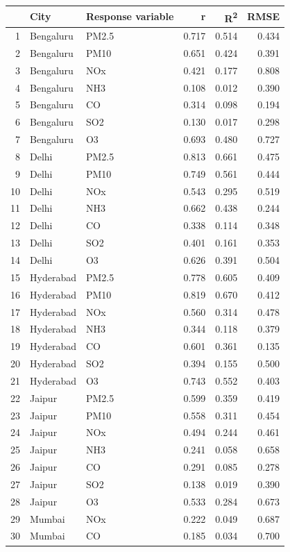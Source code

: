 \documentclass[twoside,11pt]{article}
\begin{document}
\begin{table}[ht]
\centering
\begin{tabular}{rllrrr}
  \hline
  & City & Response variable & r & R\textsuperscript{2} & RMSE \\
  \hline
1 & Bengaluru & PM2.5 & 0.717 & 0.514 & 0.434 \\ 
  2 & Bengaluru & PM10 & 0.651 & 0.424 & 0.391 \\ 
  3 & Bengaluru & NOx & 0.421 & 0.177 & 0.808 \\ 
  4 & Bengaluru & NH3 & 0.108 & 0.012 & 0.390 \\ 
  5 & Bengaluru & CO & 0.314 & 0.098 & 0.194 \\ 
  6 & Bengaluru & SO2 & 0.130 & 0.017 & 0.298 \\ 
  7 & Bengaluru & O3 & 0.693 & 0.480 & 0.727 \\ 
  8 & Delhi & PM2.5 & 0.813 & 0.661 & 0.475 \\ 
  9 & Delhi & PM10 & 0.749 & 0.561 & 0.444 \\ 
  10 & Delhi & NOx & 0.543 & 0.295 & 0.519 \\ 
  11 & Delhi & NH3 & 0.662 & 0.438 & 0.244 \\ 
  12 & Delhi & CO & 0.338 & 0.114 & 0.348 \\ 
  13 & Delhi & SO2 & 0.401 & 0.161 & 0.353 \\ 
  14 & Delhi & O3 & 0.626 & 0.391 & 0.504 \\ 
  15 & Hyderabad & PM2.5 & 0.778 & 0.605 & 0.409 \\ 
  16 & Hyderabad & PM10 & 0.819 & 0.670 & 0.412 \\ 
  17 & Hyderabad & NOx & 0.560 & 0.314 & 0.478 \\ 
  18 & Hyderabad & NH3 & 0.344 & 0.118 & 0.379 \\ 
  19 & Hyderabad & CO & 0.601 & 0.361 & 0.135 \\ 
  20 & Hyderabad & SO2 & 0.394 & 0.155 & 0.500 \\ 
  21 & Hyderabad & O3 & 0.743 & 0.552 & 0.403 \\ 
  22 & Jaipur & PM2.5 & 0.599 & 0.359 & 0.419 \\ 
  23 & Jaipur & PM10 & 0.558 & 0.311 & 0.454 \\ 
  24 & Jaipur & NOx & 0.494 & 0.244 & 0.461 \\ 
  25 & Jaipur & NH3 & 0.241 & 0.058 & 0.658 \\ 
  26 & Jaipur & CO & 0.291 & 0.085 & 0.278 \\ 
  27 & Jaipur & SO2 & 0.138 & 0.019 & 0.390 \\ 
  28 & Jaipur & O3 & 0.533 & 0.284 & 0.673 \\ 
  29 & Mumbai & NOx & 0.222 & 0.049 & 0.687 \\ 
  30 & Mumbai & CO & 0.185 & 0.034 & 0.700 \\ 
    \hline
\end{tabular}
\end{table}
\end{document}
